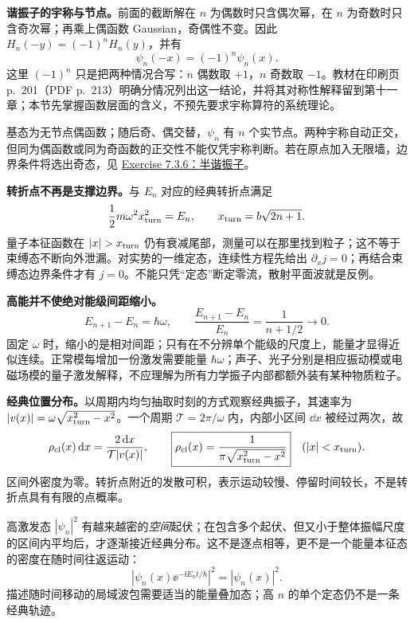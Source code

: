 \textbf{谐振子的宇称与节点。}前面的截断解在 $n$ 为偶数时只含偶次幂，在 $n$ 为奇数时只含奇次幂；再乘上偶函数 Gaussian，奇偶性不变。因此 $H_n(-y)=(-1)^nH_n(y)$，并有
\begin{equation}
  \psi_n(-x)=(-1)^n\psi_n(x).
\end{equation}
这里 $(-1)^n$ 只是把两种情况合写：$n$ 偶数取 $+1$，$n$ 奇数取 $-1$。教材在印刷页 p.~201（PDF p.~213）明确分情况列出这一结论，并将其对称性解释留到第十一章；本节先掌握函数层面的含义，不预先要求宇称算符的系统理论。

基态为无节点偶函数；随后奇、偶交替，$\psi_n$ 有 $n$ 个实节点。两种宇称自动正交，但同为偶函数或同为奇函数的正交性不能仅凭宇称判断。若在原点加入无限墙，边界条件将选出奇态，见
\hyperref[exercise:QM-C07-S03-E06]{Exercise 7.3.6：半谐振子}。

\textbf{转折点不再是支撑边界。}与 $E_n$ 对应的经典转折点满足
\begin{equation}
  \frac12m\omega^2x_{\rm turn}^2=E_n,
  \qquad x_{\rm turn}=b\sqrt{2n+1}.
\end{equation}
量子本征函数在 $|x|>x_{\rm turn}$ 仍有衰减尾部，测量可以在那里找到粒子；这不等于束缚态不断向外泄漏。对实势的一维定态，连续性方程先给出 $\partial_x j=0$；再结合束缚态边界条件才有 $j=0$。不能只凭“定态”断定零流，散射平面波就是反例。

\textbf{高能并不使绝对能级间距缩小。}
\begin{equation}
  E_{n+1}-E_n=\hbar\omega,\qquad
  \frac{E_{n+1}-E_n}{E_n}=\frac1{n+1/2}\longrightarrow0.
\end{equation}
固定 $\omega$ 时，缩小的是相对间距；只有在不分辨单个能级的尺度上，能量才显得近似连续。正常模每增加一份激发需要能量 $\hbar\omega$；声子、光子分别是相应振动模或电磁场模的量子激发解释，不应理解为所有力学振子内部都额外装有某种物质粒子。

\textbf{经典位置分布。}以周期内均匀抽取时刻的方式观察经典振子，其速率为
$|v(x)|=\omega\sqrt{x_{\rm turn}^2-x^2}$。一个周期 $\mathcal T=2\pi/\omega$ 内，内部小区间 $\dd x$ 被经过两次，故
\begin{equation}
  \rho_{\rm cl}(x)\mathop{}\!\mathrm{d} x=\frac{2\mathop{}\!\mathrm{d} x}{\mathcal T|v(x)|},\qquad
  \boxed{\rho_{\rm cl}(x)=\frac1{\pi\sqrt{x_{\rm turn}^2-x^2}}}
  \quad (|x|<x_{\rm turn}).
\end{equation}
区间外密度为零。转折点附近的发散可积，表示运动较慢、停留时间较长，不是转折点具有有限的点概率。

高激发态 $|\psi_n|^2$ 有越来越密的\emph{空间}起伏；在包含多个起伏、但又小于整体振幅尺度的区间内平均后，才逐渐接近经典分布。这不是逐点相等，更不是一个能量本征态的密度在随时间往返运动：
\begin{equation}
  |\psi_n(x)\ee^{-\ii E_nt/\hbar}|^2=|\psi_n(x)|^2.
\end{equation}
描述随时间移动的局域波包需要适当的能量叠加态；高 $n$ 的单个定态仍不是一条经典轨迹。

